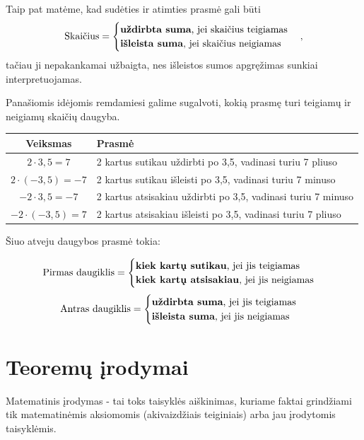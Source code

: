 \documentclass{article}
\begin{document}
Taip pat matėme, kad sudėties ir atimties prasmė gali būti $$\text{Skaičius}=\begin{cases} \text{\textbf{uždirbta suma}, jei skaičius teigiamas} \\ \text{\textbf{išleista suma}, jei skaičius neigiamas}\end{cases},$$ tačiau ji nepakankamai užbaigta, nes išleistos sumos apgręžimas sunkiai interpretuojamas.

Panašiomis idėjomis remdamiesi galime sugalvoti, kokią prasmę turi teigiamų ir neigiamų skaičių daugyba.

\begin{tabular}{|c|l|}
\hline
\textbf{Veiksmas} & \textbf{Prasmė} \\ \hline 
$2 \cdot 3,5 = 7$ & 2 kartus sutikau uždirbti po 3,5, vadinasi turiu 7 pliuso\\ \hline
$2 \cdot (-3,5) = -7$ & 2 kartus sutikau išleisti po 3,5, vadinasi turiu 7 minuso\\ \hline
$-2 \cdot 3,5 = -7$ & 2 kartus atsisakiau uždirbti po 3,5, vadinasi turiu 7 minuso\\ \hline
$-2\cdot (- 3,5) = 7$ & 2 kartus atsisakiau išleisti po 3,5, vadinasi turiu 7 pliuso \\ \hline
\end{tabular}

Šiuo atveju daugybos prasmė tokia:

$$\text{Pirmas daugiklis} = \begin{cases} \text{\textbf{kiek kartų sutikau}, jei jis teigiamas} \\ \text{\textbf{kiek kartų atsisakiau}, jei jis neigiamas}\end{cases}$$ $$\text{Antras daugiklis} = \begin{cases} \text{\textbf{uždirbta suma}, jei jis teigiamas} \\ \text{\textbf{išleista suma}, jei jis neigiamas}\end{cases}$$

\section*{Teoremų įrodymai}
\begin{mdframed}[backgroundcolor=yellow!50!white]
Matematinis įrodymas - tai toks taisyklės aiškinimas, kuriame faktai grindžiami tik matematinėmis aksiomomis (akivaizdžiais teiginiais) arba jau įrodytomis taisyklėmis.
\end{mdframed}
\end{document}
